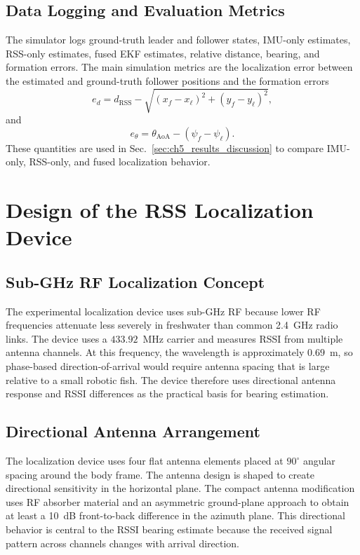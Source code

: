 \documentclass{uhcoethesis}
\begin{document}
\subsection{Data Logging and Evaluation Metrics}

The simulator logs ground-truth leader and follower states, IMU-only estimates, RSS-only estimates, fused EKF estimates, relative distance, bearing, and formation errors. The main simulation metrics are the localization error between the estimated and ground-truth follower positions and the formation errors
\begin{equation}
    e_d = d_{\mathrm{RSS}} - \sqrt{(x_f-x_\ell)^2+(y_f-y_\ell)^2},
    \label{eq:ch5_sim_distance_error}
\end{equation}
and
\begin{equation}
    e_{\theta} = \theta_{\mathrm{AoA}}-(\psi_f-\psi_\ell).
    \label{eq:ch5_sim_bearing_error}
\end{equation}
These quantities are used in Sec.~\ref{sec:ch5_results_discussion} to compare IMU-only, RSS-only, and fused localization behavior.

\section{Design of the RSS Localization Device}

\subsection{Sub-GHz RF Localization Concept}

The experimental localization device uses sub-GHz RF because lower RF frequencies attenuate less severely in freshwater than common 2.4~GHz radio links. The device uses a $433.92$~MHz carrier and measures RSSI from multiple antenna channels. At this frequency, the wavelength is approximately $0.69$~m, so phase-based direction-of-arrival would require antenna spacing that is large relative to a small robotic fish. The device therefore uses directional antenna response and RSSI differences as the practical basis for bearing estimation.

\subsection{Directional Antenna Arrangement}

The localization device uses four flat antenna elements placed at $90^\circ$ angular spacing around the body frame. The antenna design is shaped to create directional sensitivity in the horizontal plane. The compact antenna modification uses RF absorber material and an asymmetric ground-plane approach to obtain at least a 10~dB front-to-back difference in the azimuth plane. This directional behavior is central to the RSSI bearing estimate because the received signal pattern across channels changes with arrival direction.
\end{document}
